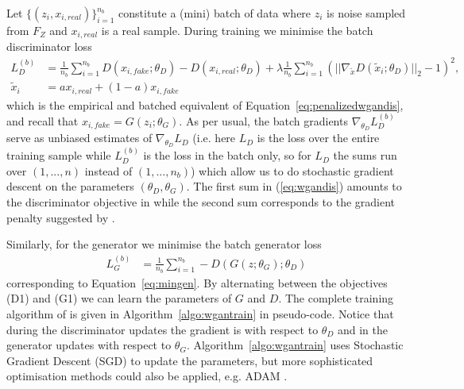 \documentclass[12pt]{article}
\begin{document}
Let $\{(z_i, x_{i,real})\}_{i=1}^{n_b}$ constitute a (mini) batch of data where $z_i$ is noise sampled from $F_Z$ and $x_{i,real}$ is a real sample. During training we minimise the batch discriminator loss
\begin{align*}
L^{(b)}_D &= \frac{1}{n_b} \sum_{i=1}^{n_b} D(x_{i,fake}; \theta_D) - D(x_{i,real}; \theta_D) + \lambda \frac{1}{n_b} \sum_{i=1}^{n_b} \left( |\!| \nabla_{\tilde{x}} D(\tilde{x}_i; \theta_D) |\!|_2 - 1\right)^2, \tag{D1} \label{eq:wgandis}\\
\tilde{x}_i &= a x_{i,real} + (1-a) x_{i,fake}
\end{align*}
which is the empirical and batched equivalent of Equation~\ref{eq:penalizedwgandis}, and recall that $x_{i,fake} = G(z_i; \theta_G)$. As per usual, the batch gradients $\nabla_{\theta_D} L_{D}^{(b)}$ serve as unbiased estimates of $\nabla_{\theta_D} L_D$ (i.e. here $L_D$ is the loss over the entire training sample while $L_D^{(b)}$ is the loss in the batch only, so for $L_D$ the sums run over $(1, ..., n)$ instead of $(1, ..., n_b)$) which allow us to do stochastic gradient descent on the parameters $(\theta_D, \theta_G)$. The first sum in (\ref{eq:wgandis}) amounts to the discriminator objective in \citet{arjovsky2017wasserstein} while the second sum corresponds to the gradient penalty suggested by \citet{gulrajani2017improved}. 

Similarly, for the generator we minimise the batch generator loss
\begin{align*}
L^{(b)}_G &= \frac{1}{n_b} \sum_{i=1}^{n_b} - D(G(z; \theta_G); \theta_D) \tag{G1}\label{eq:wgangen}
\end{align*}
corresponding to Equation~\ref{eq:mingen}.  By alternating between the objectives (D1) and (G1) we can learn the parameters of $G$ and $D$. The complete training algorithm of \citet{gulrajani2017improved} is given in Algorithm~\ref{algo:wgantrain} in pseudo-code. Notice that during the discriminator updates the gradient is with respect to $\theta_D$ and in the generator updates with respect to $\theta_G$. Algorithm~\ref{algo:wgantrain} uses Stochastic Gradient Descent (SGD) to update the parameters, but more sophisticated optimisation methods could also be applied, e.g. ADAM \citep{kingma2014adam}.
\end{document}
